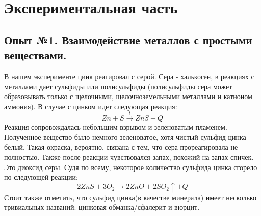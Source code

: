 \documentclass[a4paper, 12pt]{article}
\begin{document}
\section{Экспериментальная часть}
\subsection{Опыт №1. Взаимодействие металлов с простыми веществами.}
В нашем эксперименте цинк реагировал с серой. Сера - халькоген, в реакциях с металлами дает сульфиды или полисульфиды (полисульфиды сера может образовывать только с щелочными, щелочноземельными металлами и катионом аммония). В случае с цинком идет следующая реакция:
\begin{equation}
    Zn + S  \xrightarrow{t} ZnS + Q
\end{equation}
Реакция сопровождалась небольшим взрывом и зеленоватым пламенем. Полученное вещество было немного зеленоватое, хотя чистый сульфид цинка - белый. Такая окраска, вероятно, связана с тем, что сера прореагировала не полностью. Также после реакции чувствовался запах, похожий на запах спичек. Это диоксид серы. Судя по всему, некоторое количество сульфида цинка сгорело по следующей реакции:
\begin{equation}
    2ZnS + 3O_2 \xrightarrow{} 2ZnO + 2SO_2\uparrow + Q
\end{equation}
Стоит также отметить, что сульфид цинка(в качестве минерала) имеет несколько тривиальных названий: цинковая обманка/сфалерит и вюрцит.
\end{document}
